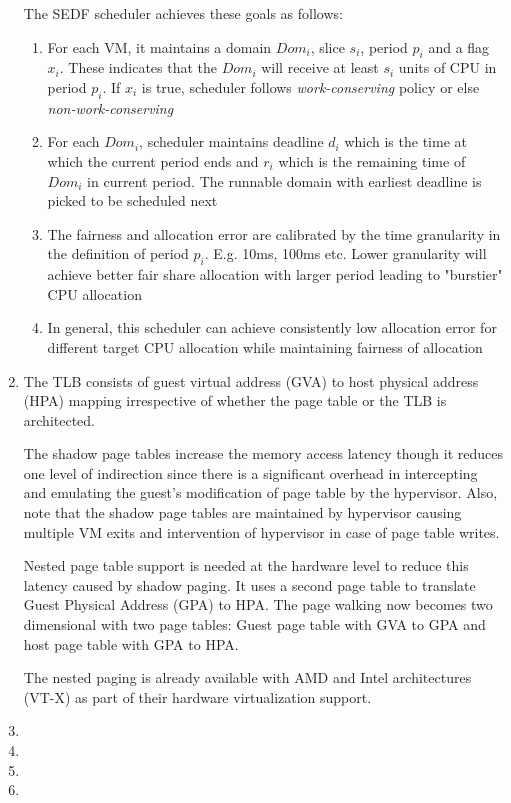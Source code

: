 \documentclass[11pt,a4paper,oneside]{article}
\begin{document}
\begin{enumerate}
		The SEDF scheduler achieves these goals as follows:
		\begin{enumerate}
			\item For each VM, it maintains a domain $Dom_i$, slice $s_i$, period $p_i$ and a flag $x_i$. These indicates that the $Dom_i$ will receive at least $s_i$ units of CPU in period $p_i$. If $x_i$ is true, scheduler follows \emph{work-conserving} policy or else \emph{non-work-conserving}
			\item For each $Dom_i$, scheduler maintains deadline $d_i$ which is the time at which the current period ends and $r_i$ which is the remaining time of $Dom_i$ in current period. The runnable domain with earliest deadline is picked to be scheduled next
			\item The fairness and allocation error are calibrated by the time granularity in the definition of period $p_i$. E.g. 10ms, 100ms etc. Lower granularity will achieve better fair share allocation with larger period leading to "burstier" CPU allocation
			\item In general, this scheduler can achieve consistently low allocation error for different target CPU allocation while maintaining fairness of allocation
		\end{enumerate}
 		\item The TLB consists of guest virtual address (GVA) to host physical address (HPA) mapping irrespective of whether the page table or the TLB is architected.
 		
 		The shadow page tables increase the memory access latency though it reduces one level of indirection since there is a significant overhead in intercepting and emulating the guest's modification of page table by the hypervisor. Also, note that the shadow page tables are maintained by hypervisor causing multiple VM exits and intervention of hypervisor in case of page table writes.
 		
 		Nested page table support is needed at the hardware level to reduce this latency caused by shadow paging. It uses a second page table to translate Guest Physical Address (GPA) to HPA. The page walking now becomes two dimensional with two page tables: Guest page table with GVA to GPA and host page table with GPA to HPA. 
 		
 		The nested paging is already available with AMD and Intel architectures (VT-X) as part of their hardware virtualization support.
 		
		\item 
		\item 
		\item 
		\item
		

\end{enumerate}
\end{document}
